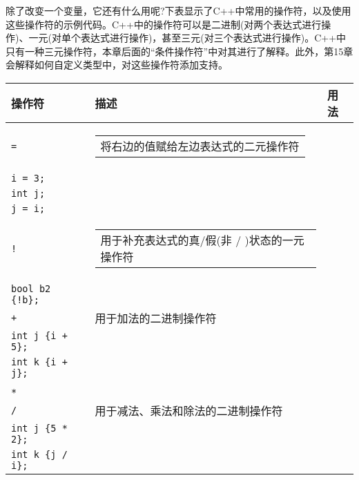 
除了改变一个变量，它还有什么用呢?下表显示了C++中常用的操作符，以及使用这些操作符的示例代码。C++中的操作符可以是二进制(对两个表达式进行操作)、一元(对单个表达式进行操作)，甚至三元(对三个表达式进行操作)。C++中只有一种三元操作符，本章后面的“条件操作符”中对其进行了解释。此外，第15章会解释如何自定义类型中，对这些操作符添加支持。

\begin{longtable}{|l|l|l|}
\hline
\textbf{操作符} &
\textbf{描述} &
\textbf{用法} \\ \hline
\endfirsthead
%
\endhead
%
\verb|=| &
\begin{tabular}[c]{@{}l@{}}将右边的值赋给左边表达式的二元操作符\end{tabular} &
\begin{tabular}[c]{@{}l@{}}\verb|int i;| \\ \verb|i = 3;| \\ \verb|int j;| \\ \verb|j = i;| \end{tabular} \\ \hline
\verb|!| &
\begin{tabular}[c]{@{}l@{}}用于补充表达式的真/假(非 \verb|0| / \verb|0| )状态的一元操作符\end{tabular} &
\begin{tabular}[c]{@{}l@{}}\verb|bool b {!true};|\\ \verb|bool b2 {!b};|\end{tabular} \\ \hline
\verb|+| &
用于加法的二进制操作符 &
\begin{tabular}[c]{@{}l@{}}\verb|int i {3 + 2};|\\ \verb|int j {i + 5};|\\ \verb|int k {i + j};| \end{tabular} \\ \hline
\begin{tabular}[c]{@{}l@{}}\verb|-| \\ \verb|*| \\ \verb|/| \end{tabular} &
用于减法、乘法和除法的二进制操作符 &
\begin{tabular}[c]{@{}l@{}}\verb|int i {5 – 1};|\\ \verb|int j {5 * 2};|\\ \verb|int k {j / i};|\end{tabular} \\ \hline

\end{longtable}
